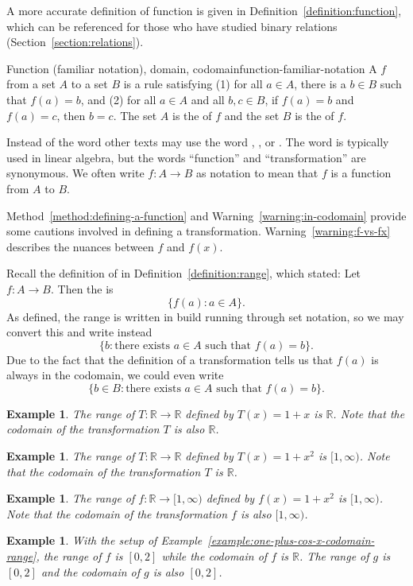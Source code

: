 \documentclass{book}
\newcounter{ekcounter}%
\theoremstyle{ekimcustom}
\newtheorem{example}[ekcounter]{Example}
\newcommand\defn[1]{{\color{blue}{\bf #1}}}
\begin{document}
A more accurate definition of function is given in Definition~\ref{definition:function}, which can be referenced for those who have studied binary relations (Section~\ref{section:relations}).
\begin{bdefinition}{Function (familiar notation), domain, codomain}{function-familiar-notation}
A \defn{function} $f$ from a set $A$ to a set $B$ is a rule satisfying (1) for all $a \in A$, there is a $b \in B$ such that $f(a)=b$, and (2) for all $a \in A$ and all $b, c \in B$, if $f(a)=b$ and $f(a)=c$, then $b=c$.
\vskip6pt
The set $A$ is the \defn{domain} of $f$ and the set $B$ is the \defn{codomain} of $f$.
\end{bdefinition}
Instead of the word \defn{function} other texts may use the word \defn{map}, \defn{mapping}, or \defn{transformation}. The word \defn{transformation} is typically used in linear algebra, but the words ``function'' and ``transformation'' are synonymous. We often write $f : A \to B$ as notation to mean that $f$ is a function from $A$ to $B$.

Method~\ref{method:defining-a-function} and Warning~\ref{warning:in-codomain} provide some cautions involved in defining a transformation. Warning~\ref{warning:f-vs-fx} describes the nuances between $f$ and $f(x)$.

Recall the definition of \defn{range} in Definition~\ref{definition:range}, which stated: Let $f : A \to B$. Then the \defn{range of $f$} is \[ \{ f(a) : a \in A \}.\]
As defined, the range is written in build running through set notation, so we may convert this and write instead
\[ \{ b : \text{there exists } a \in A \text{ such that } f(a)=b\}.\]
Due to the fact that the definition of a transformation tells us that $f(a)$ is always in the codomain, we could even write
\[\{ b \in B : \text{there exists } a \in A \text{ such that } f(a)=b\}.\]

\begin{example}\label{example:first-transformation}
The range of $T : \mathbb{R} \to \mathbb{R}$ defined by $T(x) = 1 + x$ is $\mathbb{R}$. Note that the codomain of the transformation $T$ is also $\mathbb{R}$.
\end{example}
\begin{example}
The range of $T : \mathbb{R} \to \mathbb{R}$ defined by $T(x) = 1 + x^2$ is $[1,\infty)$. Note that the codomain of the transformation $T$ is $\mathbb{R}$.
\end{example}
\begin{example}
The range of $f : \mathbb{R} \to [1,\infty)$ defined by $f(x) = 1 + x^2$ is $[1,\infty)$. Note that the codomain of the transformation $f$ is also $[1,\infty)$.
\end{example}
\begin{example}
With the setup of Example~\ref{example:one-plus-cos-x-codomain-range}, the range of $f$ is $[0,2]$ while the codomain of $f$ is $\mathbb{R}$. The range of $g$ is $[0,2]$ and the codomain of $g$ is also $[0,2]$.
\end{example}
\end{document}
